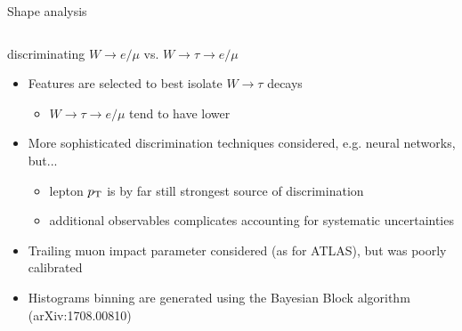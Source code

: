 \begin{frame}{Shape analysis}
\smaller 
    \begin{columns}
        \begin{block}{\smaller discriminating $W\rightarrow e/\mu$ vs. $W\rightarrow\tau\rightarrow e/\mu$}
            \begin{itemize}
                \item Features are selected to best isolate
                    $W\rightarrow\tau$ decays 
                \begin{itemize}
                \smaller
                    \item \alert{$W\rightarrow\tau\rightarrow e/\mu$ tend to have lower \pt}
                \end{itemize}
                \item More sophisticated discrimination techniques considered, e.g.
                    neural networks, but...
                \begin{itemize}
                \smaller
                    \item lepton $p_{\mathrm{T}}$ is by far still strongest source of discrimination
                    \item additional observables complicates accounting for systematic uncertainties
                \end{itemize}
                \item Trailing muon impact parameter considered (as for ATLAS), but was poorly calibrated
                \item Histograms binning are generated using the Bayesian Block algorithm (arXiv:1708.00810)
            \end{itemize}

        \end{block}



\end{columns}
\end{frame}
